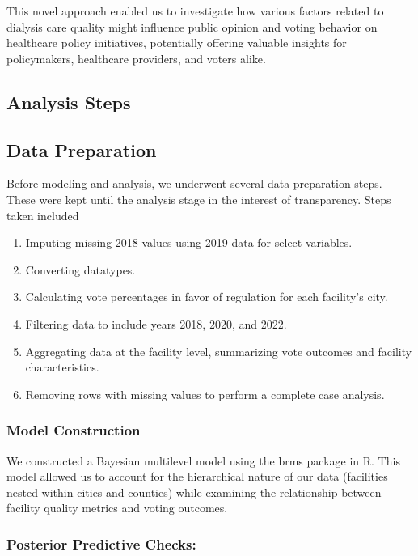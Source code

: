 \documentclass[
  11pt,
  letterpaper,
  DIV=11,
  numbers=noendperiod]{scrartcl}
\providecommand{\tightlist}{%
  \setlength{\itemsep}{0pt}\setlength{\parskip}{0pt}}\usepackage{longtable,booktabs,array}
\begin{document}
This novel approach enabled us to investigate how various factors
related to dialysis care quality might influence public opinion and
voting behavior on healthcare policy initiatives, potentially offering
valuable insights for policymakers, healthcare providers, and voters
alike.

\subsection{Analysis Steps}\label{analysis-steps}

\subsection{Data Preparation}\label{data-preparation}

Before modeling and analysis, we underwent several data preparation
steps. These were kept until the analysis stage in the interest of
transparency. Steps taken included

\begin{enumerate}
\def\labelenumi{\arabic{enumi}.}
\tightlist
\item
  Imputing missing 2018 values using 2019 data for select variables.
\item
  Converting datatypes.\\
\item
  Calculating vote percentages in favor of regulation for each
  facility's city.
\item
  Filtering data to include years 2018, 2020, and 2022.
\item
  Aggregating data at the facility level, summarizing vote outcomes and
  facility characteristics.
\item
  Removing rows with missing values to perform a complete case analysis.
\end{enumerate}

\subsubsection{Model Construction}\label{model-construction}

We constructed a Bayesian multilevel model using the brms package in R.
This model allowed us to account for the hierarchical nature of our data
(facilities nested within cities and counties) while examining the
relationship between facility quality metrics and voting outcomes.

\subsubsection{Posterior Predictive
Checks:}\label{posterior-predictive-checks}
\end{document}
